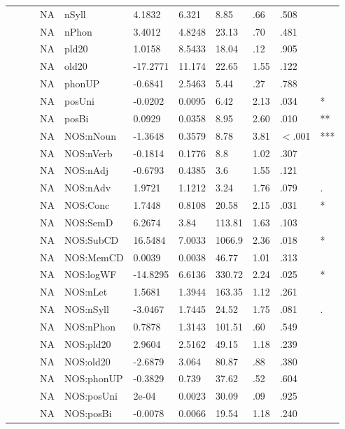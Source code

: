 \begin{table}[ht]
\begin{tabular}{lllllllllll}
   &  &  & NA & nSyll & 4.1832 & 6.321 & 8.85 & .66 & .508 &   \\ 
   &  &  & NA & nPhon & 3.4012 & 4.8248 & 23.13 & .70 & .481 &   \\ 
   &  &  & NA & pld20 & 1.0158 & 8.5433 & 18.04 & .12 & .905 &   \\ 
   &  &  & NA & old20 & -17.2771 & 11.174 & 22.65 & 1.55 & .122 &   \\ 
   &  &  & NA & phonUP & -0.6841 & 2.5463 & 5.44 & .27 & .788 &   \\ 
   &  &  & NA & posUni & -0.0202 & 0.0095 & 6.42 & 2.13 & .034 & * \\ 
   &  &  & NA & posBi & 0.0929 & 0.0358 & 8.95 & 2.60 & .010 & ** \\ 
   &  &  & NA & NOS:nNoun & -1.3648 & 0.3579 & 8.78 & 3.81 & $<$.001 & *** \\ 
   &  &  & NA & NOS:nVerb & -0.1814 & 0.1776 & 8.8 & 1.02 & .307 &   \\ 
   &  &  & NA & NOS:nAdj & -0.6793 & 0.4385 & 3.6 & 1.55 & .121 &   \\ 
   &  &  & NA & NOS:nAdv & 1.9721 & 1.1212 & 3.24 & 1.76 & .079 & . \\ 
   &  &  & NA & NOS:Conc & 1.7448 & 0.8108 & 20.58 & 2.15 & .031 & * \\ 
   &  &  & NA & NOS:SemD & 6.2674 & 3.84 & 113.81 & 1.63 & .103 &   \\ 
   &  &  & NA & NOS:SubCD & 16.5484 & 7.0033 & 1066.9 & 2.36 & .018 & * \\ 
   &  &  & NA & NOS:MemCD & 0.0039 & 0.0038 & 46.77 & 1.01 & .313 &   \\ 
   &  &  & NA & NOS:logWF & -14.8295 & 6.6136 & 330.72 & 2.24 & .025 & * \\ 
   &  &  & NA & NOS:nLet & 1.5681 & 1.3944 & 163.35 & 1.12 & .261 &   \\ 
   &  &  & NA & NOS:nSyll & -3.0467 & 1.7445 & 24.52 & 1.75 & .081 & . \\ 
   &  &  & NA & NOS:nPhon & 0.7878 & 1.3143 & 101.51 & .60 & .549 &   \\ 
   &  &  & NA & NOS:pld20 & 2.9604 & 2.5162 & 49.15 & 1.18 & .239 &   \\ 
   &  &  & NA & NOS:old20 & -2.6879 & 3.064 & 80.87 & .88 & .380 &   \\ 
   &  &  & NA & NOS:phonUP & -0.3829 & 0.739 & 37.62 & .52 & .604 &   \\ 
   &  &  & NA & NOS:posUni & 2e-04 & 0.0023 & 30.09 & .09 & .925 &   \\ 
   &  &  & NA & NOS:posBi & -0.0078 & 0.0066 & 19.54 & 1.18 & .240 &   \\ 
   \hline
\end{tabular}
\endgroup
\end{table}
